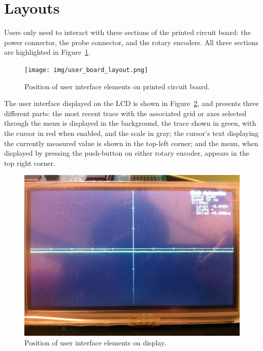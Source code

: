 \documentclass{scrartcl}
\begin{document}
	\section{Layouts}
	Users only need to interact with three sections of the printed circuit board: the power connector, the probe connector, and the rotary encoders. All three sections are highlighted in Figure~\ref{fig:user_board_layout}. \\

	\begin{figure}[h]
	\texttt{[image: img/user\_board\_layout.png]}
                	\caption{Position of user interface elements on printed circuit board.}
               	\label{fig:user_board_layout}
	\end{figure}

	The user interface displayed on the LCD is shown in Figure~\ref{fig:user_screen_layout}, and presents three different parts: the most recent trace with the associated grid or axes selected through the menu is displayed in the background, the trace shown in green, with the cursor in red when enabled, and the scale in gray; the cursor's text displaying the currently measured value is shown in the top-left corner; and the menu, when displayed by pressing the push-button on either rotary encoder, appears in the top right corner.

	\begin{figure}[t]
	\includegraphics[width=\textwidth]{img/user_screen_layout.jpg}
                	\caption{Position of user interface elements on display.}
               	\label{fig:user_screen_layout}
	\end{figure}
\end{document}
